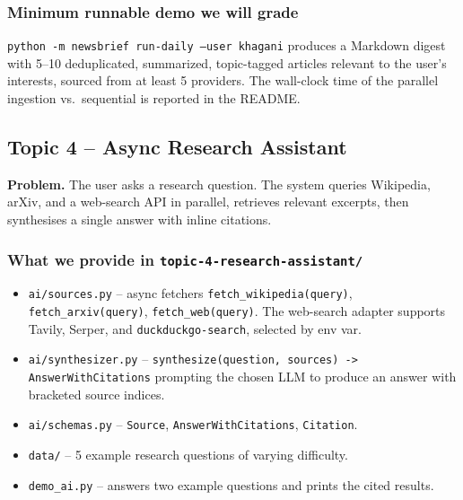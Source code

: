 \documentclass[11pt,a4paper]{article}
\begin{document}
\subsubsection{Minimum runnable demo we will grade}
\texttt{python -m newsbrief run-daily --user khagani} produces a Markdown digest with 5--10 deduplicated, summarized, topic-tagged articles relevant to the user's interests, sourced from at least 5 providers. The wall-clock time of the parallel ingestion vs.\ sequential is reported in the README.

\subsection{Topic 4 -- Async Research Assistant}
\textbf{Problem.} The user asks a research question. The system queries Wikipedia, arXiv, and a web-search API in parallel, retrieves relevant excerpts, then synthesises a single answer with inline citations.

\subsubsection{What we provide in \texttt{topic-4-research-assistant/}}
\begin{itemize}[topsep=2pt,itemsep=1pt]
  \item \texttt{ai/sources.py} -- async fetchers \texttt{fetch\_wikipedia(query)}, \texttt{fetch\_arxiv(query)}, \texttt{fetch\_web(query)}. The web-search adapter supports Tavily, Serper, and \texttt{duckduckgo-search}, selected by env var.
  \item \texttt{ai/synthesizer.py} -- \texttt{synthesize(question, sources) -> AnswerWithCitations} prompting the chosen LLM to produce an answer with bracketed source indices.
  \item \texttt{ai/schemas.py} -- \texttt{Source}, \texttt{AnswerWithCitations}, \texttt{Citation}.
  \item \texttt{data/} -- 5 example research questions of varying difficulty.
  \item \texttt{demo\_ai.py} -- answers two example questions and prints the cited results.
\end{itemize}
\end{document}
